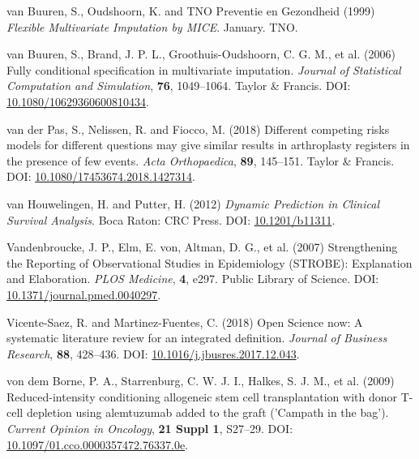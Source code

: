 \documentclass[
  letterpaper,
  paper=240mm:170mm,
  twoside=true,
  open=right,
  fontsize=10pt,
  pagesize=false,
  BCOR=15mm,
  DIV=14,
  headinclude=true,
  footinclude=false,
  headsepline=on]{scrbook}
\newlength{\cslhangindent}
\newenvironment{CSLReferences}[2] %
 {\begin{list}{}{%
  \setlength{\itemindent}{0pt}
  \setlength{\leftmargin}{0pt}
  \setlength{\parsep}{0pt}
  \ifodd #1
   \setlength{\leftmargin}{\cslhangindent}
   \setlength{\itemindent}{-1\cslhangindent}
  \fi
  \setlength{\itemsep}{#2\baselineskip}}}
 {\end{list}}
\begin{document}
\begin{CSLReferences}{1}{1}
van Buuren, S., Oudshoorn, K. and TNO Preventie en Gezondheid (1999)
\emph{Flexible {Multivariate Imputation} by {MICE}}. January. TNO.

van Buuren, S., Brand, J. P. L., Groothuis-Oudshoorn, C. G. M., et al.
(2006) Fully conditional specification in multivariate imputation.
\emph{Journal of Statistical Computation and Simulation}, \textbf{76},
1049--1064. Taylor \& Francis. DOI:
\href{https://doi.org/10.1080/10629360600810434}{10.1080/10629360600810434}.

van der Pas, S., Nelissen, R. and Fiocco, M. (2018) Different competing
risks models for different questions may give similar results in
arthroplasty registers in the presence of few events. \emph{Acta
Orthopaedica}, \textbf{89}, 145--151. Taylor \& Francis. DOI:
\href{https://doi.org/10.1080/17453674.2018.1427314}{10.1080/17453674.2018.1427314}.

van Houwelingen, H. and Putter, H. (2012) \emph{Dynamic {Prediction} in
{Clinical Survival Analysis}}. Boca Raton: CRC Press. DOI:
\href{https://doi.org/10.1201/b11311}{10.1201/b11311}.

Vandenbroucke, J. P., Elm, E. von, Altman, D. G., et al. (2007)
Strengthening the {Reporting} of {Observational Studies} in
{Epidemiology} ({STROBE}): {Explanation} and {Elaboration}. \emph{PLOS
Medicine}, \textbf{4}, e297. Public Library of Science. DOI:
\href{https://doi.org/10.1371/journal.pmed.0040297}{10.1371/journal.pmed.0040297}.

Vicente-Saez, R. and Martinez-Fuentes, C. (2018) Open {Science} now: {A}
systematic literature review for an integrated definition. \emph{Journal
of Business Research}, \textbf{88}, 428--436. DOI:
\href{https://doi.org/10.1016/j.jbusres.2017.12.043}{10.1016/j.jbusres.2017.12.043}.

von dem Borne, P. A., Starrenburg, C. W. J. I., Halkes, S. J. M., et al.
(2009) Reduced-intensity conditioning allogeneic stem cell
transplantation with donor {T-cell} depletion using alemtuzumab added to
the graft ('{Campath} in the bag'). \emph{Current Opinion in Oncology},
\textbf{21 Suppl 1}, S27--29. DOI:
\href{https://doi.org/10.1097/01.cco.0000357472.76337.0e}{10.1097/01.cco.0000357472.76337.0e}.


\end{CSLReferences}
\end{document}
